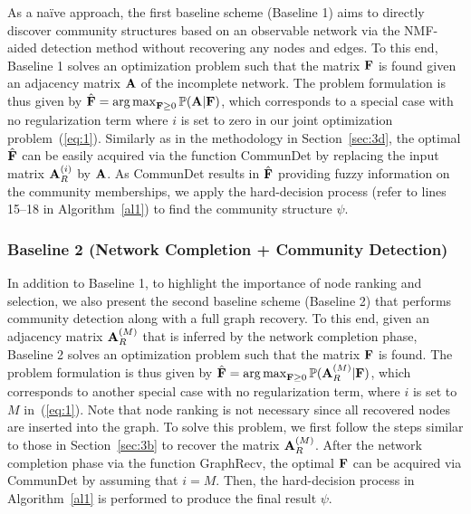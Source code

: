 \documentclass[format=acmsmall, review=false, screen=true]{acmart}
\newcommand{\argmax}{\mathop{\mathrm{arg\,max}}}
\begin{document}
As a na\"ive approach, the first baseline scheme (Baseline 1) aims to directly discover community structures based on an observable network via the NMF-aided detection method without recovering any nodes and edges. To this end, Baseline 1 solves an optimization problem such that the matrix ${\bf F}$  is found given an adjacency matrix ${\bf A}$ of the incomplete network. The problem formulation is thus given by
$\hat{{\bf F}}=\argmax_{{\bf F} \geq 0} \mathbb{P}({\bf A}|{\bf F} )$,
which corresponds to a special case with no regularization term where $i$ is set to zero in our joint optimization problem~(\ref{eq:1}). Similarly as in the methodology in Section~\ref{sec:3d}, the optimal $\hat{\bf F}$ can be easily acquired via the function \textsf{CommunDet} by replacing the input matrix ${\bf A}_R^{(i)}$ by ${\bf A}$. As \textsf{CommunDet} results in $\hat{{\bf F}}$ providing fuzzy information on the community memberships, we apply the hard-decision process (refer to lines 15--18 in Algorithm~\ref{al1}) to find the community structure $\psi$.

\subsubsection{Baseline 2 (Network Completion + Community Detection)}\label{sec5b2}

In addition to Baseline 1, to highlight the importance of node ranking and selection, we also present the second baseline scheme (Baseline 2) that performs community detection along with a full graph recovery. To this end, given an adjacency matrix ${\bf A}_R^{(M)}$ that is inferred by the network completion phase, Baseline 2 solves an optimization problem such that the matrix ${\bf F}$ is found. The problem formulation is thus given by
$\hat{{\bf F}}=\argmax_{{\bf F} \geq 0} \mathbb{P}({\bf A}^{(M)}_R|{\bf F} )$,
which corresponds to another special case with no regularization term, where $i$ is set to $M$  in~(\ref{eq:1}). Note that node ranking  is not necessary since all recovered nodes are inserted into the graph. To solve this problem, we first follow the steps similar to those in Section~\ref{sec:3b} to recover the matrix ${\bf A}^{(M)}_R$. After the network completion phase via the function \textsf{GraphRecv}, the optimal ${\bf F}$ can be acquired via \textsf{CommunDet} by assuming that $i=M$. Then, the hard-decision process  in Algorithm~\ref{al1} is performed to produce the final result $\psi$. 
\end{document}
